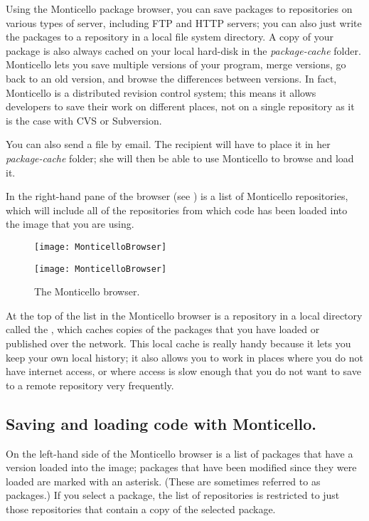 \documentclass[a4paper,10pt,twoside]{book}
\begin{document}
{Using the Monticello package browser, you can save packages to repositories on various types of server, including FTP and HTTP servers; you can also just write the packages to a repository in a local file system directory.
A copy of your package is also always cached on your local hard-disk in the \emph{package-cache} folder. 
Monticello lets you save multiple versions of your program, merge versions, go back to an old version, and browse the differences between versions. 
In fact, Monticello is a distributed revision control system; this means it allows developers to save their work on different places, not on a single repository as it is the case with CVS or Subversion.

You can also send a  file by email. 
The recipient will have to place it in her \emph{package-cache} folder; she will then be able to use Monticello to browse and load it. 

In the right-hand pane of the browser (see ) is a list of Monticello repositories, which will include all of the repositories from which code has been loaded into the image that you are using.  

\begin{figure}[hbt]
\ifluluelse
	{\centerline {\texttt{[image: MonticelloBrowser]}}}
	{\centerline {\texttt{[image: MonticelloBrowser]}}}
\caption{The Monticello browser.
}
\end{figure}

At the top of the list in the Monticello browser is a repository in a local directory called the , which caches copies of the packages that you have loaded or published over the network. This local cache is really handy because it lets you keep your own local history; it also allows you to work in places where you do not have internet access, or where access is slow enough that you do not want to save to a remote repository very frequently.


\subsection{Saving and loading code with Monticello.}
On the left-hand side of the Monticello browser is a list of packages that have a version loaded into the image; packages that have been modified since they were loaded are marked with an asterisk.  (These are sometimes referred to as  packages.)  If you select a package, the list of repositories is restricted to just those repositories that contain a copy of the selected package.

}
\end{document}

